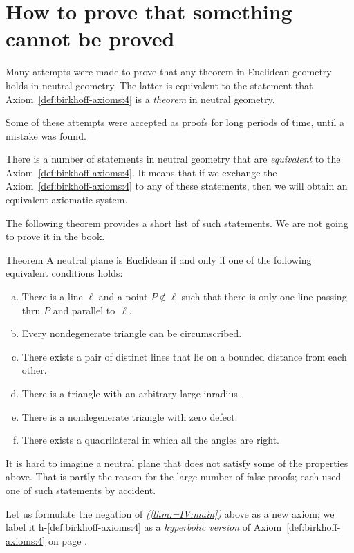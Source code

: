 \section*{How to prove that something\\ 
cannot be proved}

Many attempts were made to prove that any theorem in Euclidean geometry holds in neutral geometry.
The latter is equivalent to the statement that Axiom~\ref{def:birkhoff-axioms:4} is a {}\emph{theorem} in neutral geometry.

Some of these attempts were accepted as proofs for long periods of time, until a mistake was found.

There is a number of statements in neutral geometry that are {}\emph{equivalent} to the Axiom~\ref{def:birkhoff-axioms:4}.
It means that if we exchange the Axiom~\ref{def:birkhoff-axioms:4}  to any of these statements, then we will obtain an equivalent axiomatic system.

The following theorem provides a short list of such statements.
We are not going to prove it in the book.

\begin{thm}{Theorem}\label{thm:=IV}
A neutral plane is Euclidean if and only if one of the following equivalent conditions holds:
\begin{enumerate}[(a)]
\item\label{thm:=IV:main} 
There is a line $\ell$ 
and a point $P\notin\ell$ 
such that there is only one line passing thru $P$ 
and parallel to~$\ell$.
\item 
Every nondegenerate triangle can be circumscribed.
\item
There exists a pair of distinct lines that lie on a bounded distance from each other.
\item
There is a triangle with an arbitrary large inradius.
\item
There is a nondegenerate triangle with zero defect.
\item
There exists a quadrilateral in which all the angles are right.
\end{enumerate}
\end{thm}

It is hard to imagine a neutral plane that does not satisfy some of the properties above.
That is partly the reason for the large number of false proofs;
each used one of such statements by accident.

Let us formulate the negation of \textit{(\ref{thm:=IV:main})} above as a new axiom;
we label it h-$\!$\ref{def:birkhoff-axioms:4} as a {}\emph{hyperbolic version} of Axiom~\ref{def:birkhoff-axioms:4} on page \pageref{def:birkhoff-axioms:4}.


